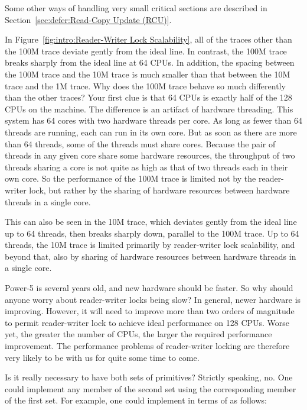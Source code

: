 	Some other ways of handling very small critical sections are
	described in Section~\ref{sec:defer:Read-Copy Update (RCU)}.

\QuickQ{}
	In
	Figure~\ref{fig:intro:Reader-Writer Lock Scalability},
	all of the traces other than the 100M trace deviate gently
	from the ideal line.
	In contrast, the 100M trace breaks sharply from the ideal
	line at 64 CPUs.
	In addition, the spacing between the 100M trace and the 10M
	trace is much smaller than that between the 10M trace and the
	1M trace.
	Why does the 100M trace behave so much differently than the
	other traces?
\QuickA{}
	Your first clue is that 64 CPUs is exactly half of the 128
	CPUs on the machine.
	The difference is an artifact of hardware threading.
	This system has 64 cores with two hardware threads per core.
	As long as fewer than 64 threads are running, each can run
	in its own core.
	But as soon as there are more than 64 threads, some of the threads
	must share cores.
	Because the pair of threads in any given core share some hardware
	resources, the throughput of two threads sharing a core is not
	quite as high as that of two threads each in their own core.
	So the performance of the 100M trace is limited not by the
	reader-writer lock, but rather by the sharing of hardware resources
	between hardware threads in a single core.

	This can also be seen in the 10M trace, which deviates gently from
	the ideal line up to 64 threads, then breaks sharply down, parallel
	to the 100M trace.
	Up to 64 threads, the 10M trace is limited primarily by reader-writer
	lock scalability, and beyond that, also by sharing of hardware
	resources between hardware threads in a single core.

\QuickQ{}
	Power-5 is several years old, and new hardware should
	be faster.
	So why should anyone worry about reader-writer locks being slow?
\QuickA{}
	In general, newer hardware is improving.
	However, it will need to improve more than two orders of magnitude
	to permit reader-writer lock to achieve ideal performance on
	128 CPUs.
	Worse yet, the greater the number of CPUs, the larger the
	required performance improvement.
	The performance problems of reader-writer locking are therefore
	very likely to be with us for quite some time to come.

\QuickQ{}
	Is it really necessary to have both sets of primitives?
\QuickA{}
	Strictly speaking, no.
	One could implement any member of the second set using the
	corresponding member of the first set.
	For example, one could implement 
	in terms of  as follows:

